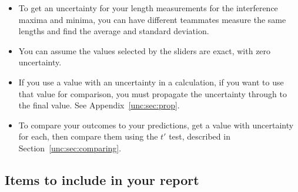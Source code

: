 \begin{itemize}
	
	

	\item To get an uncertainty for your length measurements for the interference maxima and minima, you can have different teammates measure the same lengths and find the average and standard deviation.


	\item You can assume the values selected by the sliders are exact, with zero uncertainty.
	
	
	\item If you use a value with an uncertainty in a calculation, if you want to use that value for comparison, you must propagate the uncertainty through to the final value. See Appendix~\ref{unc:sec:prop}.
	
	\item To compare your outcomes to your predictions, get a value with uncertainty for each, then compare them using the $t'$ test, described in Section~\ref{unc:sec:comparing}.
\end{itemize}

\subsection{Items to include in your report}

